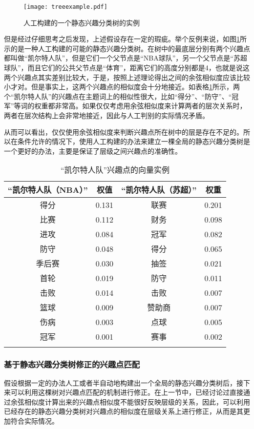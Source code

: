 \begin{figure}[ht]
\centering
\texttt{[image: treeexample.pdf]}
\caption{人工构建的一个静态兴趣分类树的实例}
\label{fig:treeexample}
\end{figure}

但是经过仔细思考之后发现，上述假设存在一定的瑕疵。举个反例来说，如图\ref{fig:treeexample}所示的是一种人工构建的可能的静态兴趣分类树。在树中的最底层分别有两个兴趣点都叫做“凯尔特人队”，但是它们一个父节点是“NBA球队”，另一个父节点是“苏超球队”，而且它们的公共父节点是“体育”，距离它们的高度分别都是4，也就是说这两个兴趣点其实差别比较大，于是，按照上述理论得出之间的余弦相似度应该比较小才对。但是事实上，这两个兴趣点的相似度会十分地接近。如表格\ref{tbl:celtics}所示，两个“凯尔特人队”的兴趣点在主题词上的相似性很大，比如“得分”、“防守”、“冠军”等词的权重都非常高。如果仅仅考虑用余弦相似度来计算两者的层次关系时，两者在层次结构上会非常地接近，因此与人工判别的实际情况矛盾。

从而可以看出，仅仅使用余弦相似度来判断兴趣点所在树中的层是存在不足的。所以在条件允许的情况下，使用人工构建的办法来建立一棵全局的静态兴趣分类树是一个更好的办法，主要是保证了层级之间兴趣点的准确性。

\begin{table}[ht]
\caption{“凯尔特人队”兴趣点的向量实例}
\centering
\begin{tabular}{cc|cc} 
\hline
“凯尔特人队（NBA）” & 权值 & “凯尔特人队（苏超）” & 权重 \\
\hline
得分 & 0.131 & 联赛 & 0.201 \\
比赛 & 0.112 & 财务 & 0.098 \\
进攻 & 0.084 & 冠军& 0.082 \\
防守 & 0.048 & 得分 & 0.065 \\
季后赛 & 0.030 & 抽签 & 0.021 \\
首轮 & 0.019 & 防守 & 0.011 \\
击败 & 0.014 & 击败 & 0.007 \\
篮球 & 0.009 & 赞助商 & 0.007 \\
伤病 & 0.003 & 点球 & 0.005 \\
冠军 & 0.001 & 赛事 & 0.002 \\
\hline
\label{tbl:celtics}
\end{tabular}
\end{table}

\subsubsection{基于静态兴趣分类树修正的兴趣点匹配}
假设根据一定的办法人工或者半自动地构建出一个全局的静态兴趣分类树后，接下来可以利用这棵树对兴趣点匹配的机制进行修正。在上一节中，已经讨论过直接通过余弦相似度计算出来的兴趣点相似度不能很好反映层级的关系，因此，可以利用已经存在的静态兴趣分类树对兴趣点的相似度在层级关系上进行修正，从而是其更加符合实际情况。

